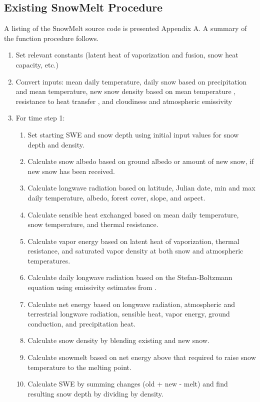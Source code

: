 \documentclass[12pt]{article}
\begin{document}
\subsection{Existing SnowMelt Procedure}
A listing of the SnowMelt source code is presented Appendix A.
A summary of the function procedure follows.
\begin{enumerate}
  \item Set relevant constants (latent heat of vaporization and fusion, snow heat capacity, etc.)
  \item Convert inputs: mean daily temperature, daily snow based on precipitation and mean temperature, new snow density based on mean temperature \citep{goodison1981measurement}, resistance to heat transfer \citep{campbell1977introduction}, and cloudiness and atmospheric emissivity \citep{fuka2014ecohydrology}
  \item For time step 1:
  \begin{enumerate}
    \item Set starting SWE and snow depth using initial input values for snow depth and density.
    \item Calculate snow albedo based on ground albedo or amount of new snow, if new snow has been received.
    \item Calculate longwave radiation based on latitude, Julian date, min and max daily temperature, albedo, forest cover, slope, and aspect.
    \item Calculate sensible heat exchanged based on mean daily temperature, snow temperature, and thermal resistance.
    \item Calculate vapor energy based on latent heat of vaporization, thermal resistance, and saturated vapor density at both snow and atmospheric temperatures.
    \item Calculate daily longwave radiation based on the Stefan-Boltzmann equation using emissivity estimates from \citet{campbell1998introduction}.
    \item Calculate net energy based on longwave radiation, atmospheric and terrestrial longwave radiation, sensible heat, vapor energy, ground conduction, and precipitation heat.
    \item Calculate snow density by blending existing and new snow.
    \item Calculate snowmelt based on net energy above that required to raise snow temperature to the melting point.
    \item Calculate SWE by summing changes (old + new - melt) and find resulting snow depth by dividing by density.

\end{enumerate}
\end{enumerate}
\end{document}
